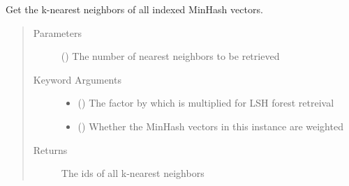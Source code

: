 \documentclass[letterpaper,10pt,english]{sphinxmanual}
\begin{document}
\begin{fulllineitems}
\begin{fulllineitems}
\end{fulllineitems}


\begin{fulllineitems}
\label{\detokenize{documentation:tmap.LSHForest.get_all_nearest_neighbors}}
Get the k-nearest neighbors of all indexed MinHash vectors.
\begin{quote}\begin{description}
\item[{Parameters}] \leavevmode
{} () \textendash{} The number of nearest neighbors to be retrieved

\item[{Keyword Arguments}] \leavevmode\begin{itemize}
\item {} 
 () \textendash{} The factor by which  is multiplied for LSH forest retreival

\item {} 
 () \textendash{} Whether the MinHash vectors in this {\hyperref[\detokenize{documentation:tmap.LSHForest}]{}} instance are weighted

\end{itemize}

\item[{Returns}] \leavevmode
{} The ids of all k-nearest neighbors

\end{description}\end{quote}

\end{fulllineitems}



\end{fulllineitems}
\end{document}

